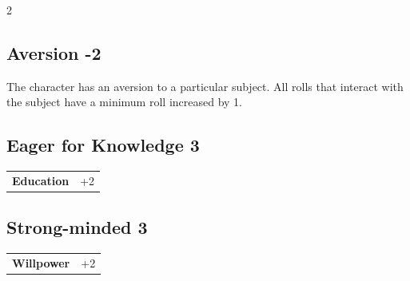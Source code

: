 \begin{multicols}{2}
\begin{tcolorbox}
\vspace{3mm}



\end{tcolorbox}

\begin{tcolorbox}
    \subsection*{Aversion \hfill \small{-2 }}
    \tcblower
The character has an aversion to a particular subject. All rolls that interact with the subject have a minimum roll increased by 1.


\vspace{3mm}



\end{tcolorbox}

\begin{tcolorbox}
    \subsection*{Eager for Knowledge \hfill \small{3 }}
    \tcblower




\begin{tabular}{@{}ll@{}}
    \textbf{Education} & +2\\
\end{tabular}


\end{tcolorbox}

\begin{tcolorbox}
    \subsection*{Strong-minded \hfill \small{3 }}
    \tcblower




\begin{tabular}{@{}ll@{}}
    \textbf{Willpower} & +2\\
\end{tabular}


\end{tcolorbox}
\end{multicols}

